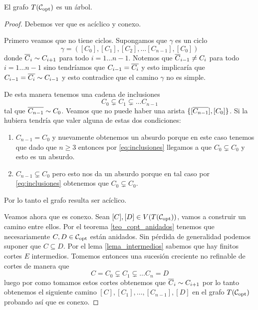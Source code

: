 \documentclass[tesis.tex]{subfiles}
\begin{document}
\begin{prop}
	El grafo $T({\cal C}_{\text{opt}})$ es un árbol.
\end{prop}

\begin{proof}
	Debemos ver que es acíclico y conexo.
	
	Primero veamos que no tiene ciclos.
	Supongamos que $\gamma$	es un ciclo
	\[
		\gamma = ([C_0], [C_1], [C_2], \dots [C_{n-1}], [C_0])
	\]
	donde $\overline C_{i} \sim C_{i+1}$ para todo $i=1 \dots n-1$.
	Notemos que $\overline C_{i-1} \neq C_{i}$ para todo $i=1 \dots n-1$ sino tendríamos que $C_{i-1} = \overline{ C_{i}}$ y esto implicaría que $C_{i-1} = \overline{C_{i}} \sim C_{i-1}$
	y esto contradice que el camino $\gamma$ no es simple.
	
	De esta manera tenemos una cadena de inclusiones
	\begin{equation}\label{eq:inclusiones}
			C_0 \subsetneq C_1 \subsetneq \dots C_{n-1}
	\end{equation}
	tal que $\overline{ C_{n-1}} \sim C_0$.
	Veamos que no puede haber una arista $\{[\overline{ C_{n-1}}], [C_0]\}$.
	Si la hubiera tendría que valer alguna de estas dos condiciones:
	\begin{enumerate}
		\item $C_{n-1} = C_{0}$ y nuevamente obtenemos un absurdo porque en este caso tenemos que dado que $n \ge 3$ entonces por \ref{eq:inclusiones} llegamos a que $C_{0} \subsetneq C_{0}$ y esto es un absurdo.
		
		\item ${C_{n-1}} \subsetneq C_{0}$ pero esto nos da un absurdo porque en tal caso por \ref{eq:inclusiones} obtenemos que $C_{0} \subsetneq C_{0}$.
	\end{enumerate}
	Por lo tanto el grafo resulta ser acíclico.
	
	Veamos ahora que es conexo.
	Sean $[C], [D] \in V(T({\cal C}_{\text{opt}}))$, vamos a construir un camino entre ellos.
	Por el teorema \ref{teo_copt_anidados} tenemos que necesariamente $C,D \in {\cal C}_{\text{opt}}$ están anidados.
	Sin pérdida de generalidad podemos suponer que $C \subseteq D$.
	Por el lema \ref{lema_intermedios} sabemos que hay finitos cortes $E$ intermedios.
	Tomemos entonces una sucesión creciente no refinable de cortes de manera que  
	\[
		C=C_0 \subsetneq C_1 \subsetneq \dots C_n = D
	\]
	luego por como tomamos estos cortes obtenemos que $\overline C_i \sim C_{i+1}$ por lo tanto obtenemos el siguiente camino $[C],[C_1], \dots, [C_{n-1}],[D]$ en el grafo $T({\cal C}_{\text{opt}})$ probando así que es conexo.	
\end{proof}
\end{document}
